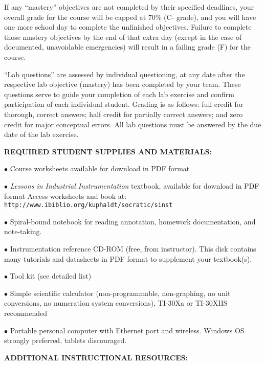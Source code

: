 If any ``mastery'' objectives are not completed by their specified deadlines, your overall grade for the course will be capped at 70\% (C- grade), and you will have one more school day to complete the unfinished objectives.  Failure to complete those mastery objectives by the end of that extra day (except in the case of documented, unavoidable emergencies) will result in a failing grade (F) for the course.

``Lab questions'' are assessed by individual questioning, at any date after the respective lab objective (mastery) has been completed by your team.  These questions serve to guide your completion of each lab exercise and confirm participation of each individual student.  Grading is as follows: full credit for thorough, correct answers; half credit for partially correct answers; and zero credit for major conceptual errors.  All lab questions must be answered by the due date of the lab exercise.


\vfil \eject

\noindent
{\bf REQUIRED STUDENT SUPPLIES AND MATERIALS:} 

\item{$\bullet$} Course worksheets available for download in PDF format
\item{$\bullet$} {\it Lessons in Industrial Instrumentation} textbook, available for download in PDF format
\itemitem{$\rightarrow$} Access worksheets and book at: {\tt http://www.ibiblio.org/kuphaldt/socratic/sinst}
\item{$\bullet$} Spiral-bound notebook for reading annotation, homework documentation, and note-taking.
\item{$\bullet$} Instrumentation reference CD-ROM (free, from instructor).  This disk contains many tutorials and datasheets in PDF format to supplement your textbook(s).
\item{$\bullet$} Tool kit (see detailed list)
\item{$\bullet$} Simple scientific calculator (non-programmable, non-graphing, no unit conversions, no numeration system conversions), TI-30Xa or TI-30XIIS recommended
\item{$\bullet$} Portable personal computer with Ethernet port and wireless.  Windows OS strongly preferred, tablets discouraged.

\vskip 10pt

\noindent
{\bf ADDITIONAL INSTRUCTIONAL RESOURCES:} 


